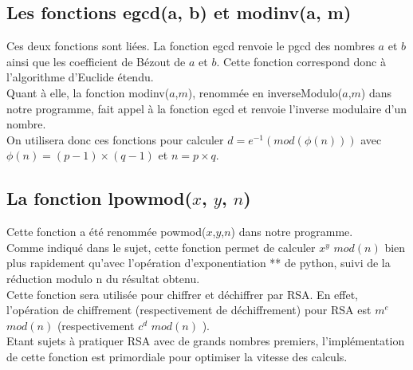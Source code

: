 \documentclass[12pt]{article}
\theoremstyle{definition}
\begin{document}
	\subsection{Les fonctions egcd(a, b) et modinv(a, m)}
	Ces deux fonctions sont liées. La fonction \textsf{egcd} renvoie le pgcd des nombres $a$ et $b$ ainsi que les coefficient de Bézout de $a$ et $b$. Cette fonction correspond donc à l'algorithme d'Euclide étendu.\\
	Quant à elle, la fonction \textsf{modinv($a$,$m$)}, renommée en \textsf{inverseModulo($a$,$m$)} dans notre programme, fait appel à la fonction \textsf{egcd} et renvoie l'inverse modulaire d'un nombre.\\
	On utilisera donc ces fonctions pour calculer $d=e^{-1}  (mod(\phi (n)))$ avec $\phi(n) = (p-1) \times (q-1)$ et $n = p \times q$.
	 \subsection{La fonction \textsf{lpowmod($x$, $y$, $n$)}}
Cette fonction a été renommée \textsf{powmod($x$,$y$,$n$)} dans notre programme.\\
	 Comme indiqué dans le sujet, cette fonction permet de calculer $x^y$ $mod(n)$ bien plus rapidement qu'avec l'opération d'exponentiation ** de python, suivi de la réduction modulo n du résultat obtenu.\\
	 Cette fonction sera utilisée pour chiffrer et déchiffrer par RSA. En effet, l'opération de chiffrement (respectivement de déchiffrement) pour RSA est $m^e$ $mod(n)$ (respectivement $c^d$ $mod(n)$ ).\\
	 Etant sujets à pratiquer RSA avec de grands nombres premiers, l'implémentation de cette fonction est primordiale pour optimiser la vitesse des calculs.
\end{document}
